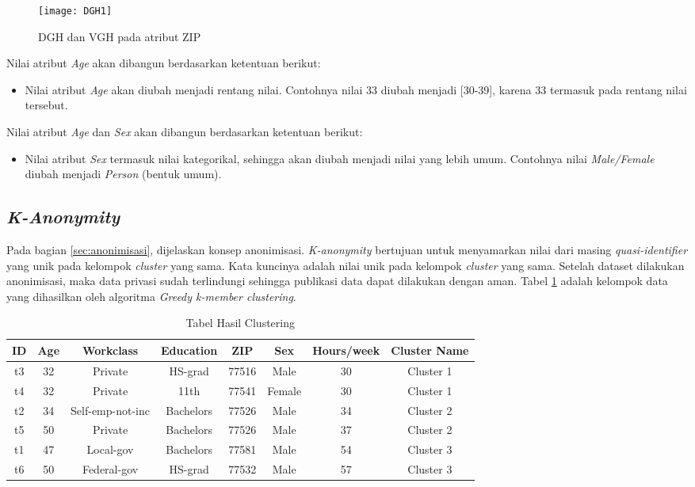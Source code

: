 \begin{figure}[H]
	\centering
	\texttt{[image: DGH1]}
	\caption{DGH dan VGH pada atribut ZIP}
	\label{fig:DGH1}
\end{figure}

\noindent Nilai atribut \textit{Age} akan dibangun berdasarkan ketentuan berikut: 

\begin{itemize}
\item Nilai atribut \textit{Age} akan diubah menjadi rentang nilai. Contohnya nilai 33  diubah menjadi [30-39], karena 33 termasuk pada rentang nilai tersebut.
\end{itemize}

\noindent Nilai atribut \textit{Age} dan \textit{Sex} akan dibangun berdasarkan ketentuan berikut: 

\begin{itemize}
\item Nilai atribut \textit{Sex} termasuk nilai kategorikal, sehingga akan diubah menjadi nilai yang lebih umum. Contohnya nilai \textit{Male/Female} diubah menjadi \textit{Person} (bentuk umum).
\end{itemize}


\newpage
\subsection{\textit{K-Anonymity}}
Pada bagian \ref{sec:anonimisasi}, dijelaskan konsep anonimisasi. \textit{K-anonymity} bertujuan untuk menyamarkan nilai dari masing \textit{quasi-identifier} yang unik pada kelompok \textit{cluster} yang sama. Kata kuncinya adalah nilai unik pada kelompok \textit{cluster} yang sama. Setelah dataset dilakukan anonimisasi, maka data privasi sudah terlindungi sehingga publikasi data dapat dilakukan dengan aman. Tabel \ref{table:clustering} adalah kelompok data yang dihasilkan oleh algoritma \textit{Greedy k-member clustering}. 
\begin{table}[H]
\centering
\caption{Tabel Hasil Clustering}
\begin{tabular}{c c c c c c c c}
\hline 
ID & Age & Workclass & Education & ZIP & Sex & Hours/week & Cluster Name\\ 
\hline 
t3 & 32 & Private & HS-grad & 77516 & Male & 30 & Cluster 1 \\ 
t4 & 32 & Private & 11th & 77541 & Female & 30 & Cluster 1 \\ 
\hline 
t2 & 34 & Self-emp-not-inc & Bachelors & 77526 & Male & 34 & Cluster 2 \\ 
t5 & 50 & Private & Bachelors & 77526 & Male & 37	& Cluster 2\\ 
\hline 
t1 & 47 & Local-gov & Bachelors & 77581 & Male & 54 & Cluster 3\\ 
t6 & 50 & Federal-gov & HS-grad & 77532 & Male & 57 & Cluster 3\\ 
\hline 
\end{tabular} 
\label{table:clustering}
\end{table}
\vspace{0.4cm}

